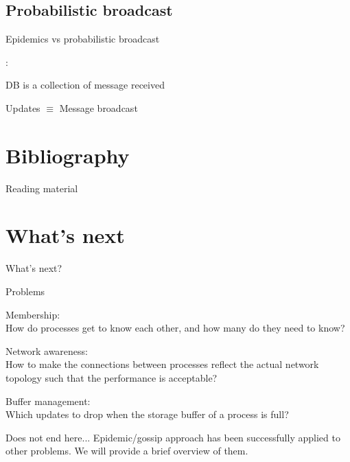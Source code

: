 \subsection{Probabilistic broadcast}

\begin{frame}{Epidemics vs probabilistic broadcast}
	
:

DB is a collection of message received

\bigskip
{}

Updates $\equiv$ Message broadcast

\end{frame}


\section{Bibliography}

\begin{frame}{Reading material}

\nocite{demers87}
\nocite{gossip11}

{\footnotesize

 
}
\end{frame}

\section{What's next}

\begin{frame}{What's next?}

\begin{block}{Problems}
\BI
\item \alert{Membership}:\\How do processes get to know each other, and how many do 
they need to know?
\item \alert{Network awareness}:\\ How to make the connections between processes reflect the actual 
network topology such that the performance is acceptable? 
\item \alert{Buffer management}:\\
Which updates to drop when the storage buffer of a process is full? 
\EI
\end{block}


\begin{block}{Does not end here...}
Epidemic/gossip approach has been successfully applied to other problems. 
We will provide a brief overview of them.
\end{block}

\end{frame}



